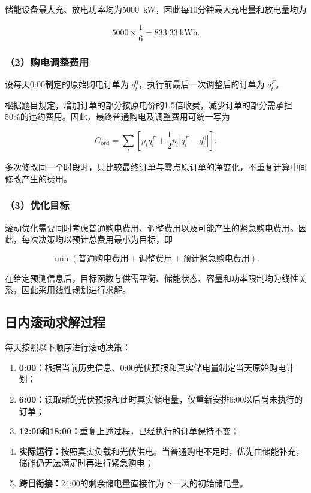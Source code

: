 储能设备最大充、放电功率均为5000~kW，因此每10分钟最大充电量和放电量均为

\[
5000\times\frac{1}{6}
=
833.33\ \mathrm{kWh}.
\]

\subsubsection*{（2）购电调整费用}

设每天0:00制定的原始购电订单为 $q_t^0$，执行前最后一次调整后的订单为 $q_t^F$。

根据题目规定，增加订单的部分按原电价的1.5倍收费，减少订单的部分需承担50\%的违约费用。因此，最终普通购电及调整费用可统一写为

\begin{equation}
C_{\mathrm{ord}}
=
\sum_t
\left[
p_t q_t^F
+
\frac{1}{2}p_t
\left|
q_t^F-q_t^0
\right|
\right].
\end{equation}

多次修改同一个时段时，只比较最终订单与零点原订单的净变化，不重复计算中间修改产生的费用。

\subsubsection*{（3）优化目标}

滚动优化需要同时考虑普通购电费用、调整费用以及可能产生的紧急购电费用。因此，每次决策均以预计总费用最小为目标，即

\[
\min
\left(
\text{普通购电费用}
+
\text{调整费用}
+
\text{预计紧急购电费用}
\right).
\]

在给定预测信息后，目标函数与供需平衡、储能状态、容量和功率限制均为线性关系，因此采用线性规划进行求解。


\subsection{日内滚动求解过程}

每天按照以下顺序进行滚动决策：

\begin{enumerate}
    \item \textbf{0:00：}根据当前历史信息、0:00光伏预报和真实储电量制定当天原始购电计划；
    \item \textbf{6:00：}读取新的光伏预报和此时真实储电量，仅重新安排6:00以后尚未执行的订单；
    \item \textbf{12:00和18:00：}重复上述过程，已经执行的订单保持不变；
    \item \textbf{实际运行：}按照真实负载和光伏供电。当普通购电不足时，优先由储能补充，储能仍无法满足时再进行紧急购电；
    \item \textbf{跨日衔接：}24:00的剩余储电量直接作为下一天的初始储电量。
\end{enumerate}

